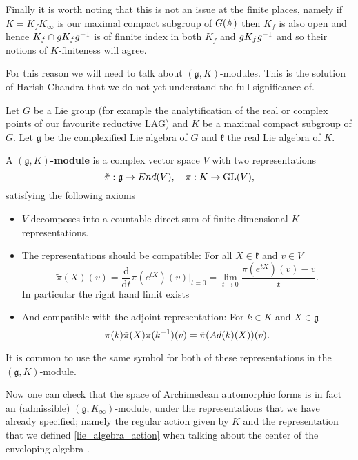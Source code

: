 \begin{example}
    Finally it is worth noting that this is not an issue at the finite places, namely if \(K = K_fK_\infty\) is our maximal compact subgroup of \(G(\A)\) then \(K_f\) is also open and hence \(K_f \cap gK_f g^{-1}\) is of finnite index in both \(K_f\) and \(gK_f g^{-1}\) and so their notions of \(K\)-finiteness will agree. 
\end{example}

For this reason we will need to talk about \((\mathfrak{g}, K)\)-modules. This is the solution of Harish-Chandra that we do not yet understand the full significance of. 

\begin{definition}
    Let \(G\) be a Lie group (for example the analytification of the real or complex points of our favourite reductive LAG) and \(K\) be a maximal compact subgroup of \(G\). Let \(\mathfrak{g}\) be the complexified Lie algebra of \(G\) and \(\mathfrak{k}\) the real Lie algebra of \(K\). 
    
    A \textbf{\((\mathfrak{g}, K)\)-module} is a complex vector space \(V\) with two representations 
    \[\tilde{\pi}: \mathfrak{g} \to End(V), \quad \pi: K\to \operatorname{GL}(V),\]
    satisfying the following axioms
    \begin{itemize}
        \item \(V\) decomposes into a countable direct sum of finite dimensional \(K\) representations.
        \item The representations should be compatible: For all \(X \in \mathfrak{k}\) and \(v\in V\)
        \[\tilde{\pi}(X)(v) = \frac{\mathrm{d}}{\mathrm{d}t}\pi(e^{tX})(v)|_{t=0} = \lim_{t\to 0}\frac{\pi(e^{tX})(v) - v}{t}.\]
        In particular the right hand limit exists
        \item And compatible with the adjoint representation: For \(k\in K\) and \(X\in \mathfrak{g}\) 
         \[\pi(k)\tilde{\pi}(X) \pi(k^{-1} )(v) = \tilde{\pi}(Ad(k)(X))(v).\]
    \end{itemize}
\end{definition}

\begin{remark}
    It is common to use the same symbol for both of these representations in the \((\mathfrak{g}, K)\)-module.
\end{remark}
Now one can check that the space of Archimedean automorphic forms is in fact an (admissible) \((\mathfrak{g}, K_\infty)\)-module, under the representations that we have already specified; namely the regular action given by \(K\) and the representation that we defined \ref{lie_algebra_action} when talking about the center of the enveloping algebra \cite[Thm. 6.2.6]{getzIntroductionAutomorphicRepresentations2024}.

